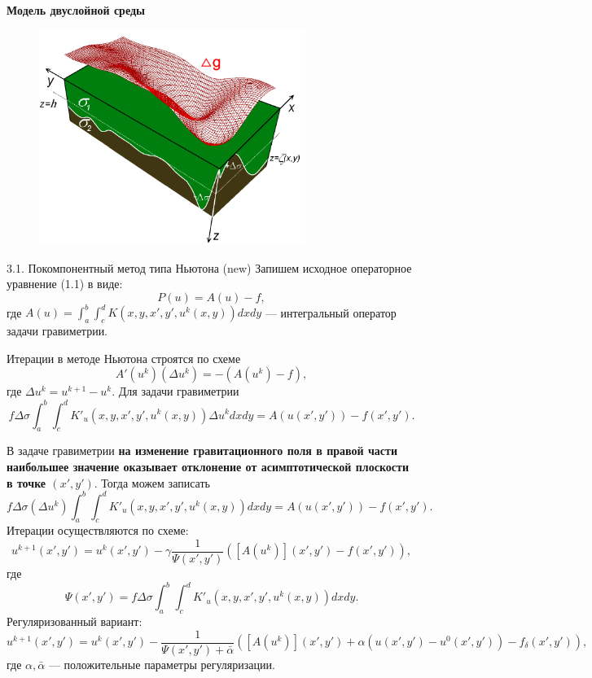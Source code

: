 \documentclass[10pt,pdf, mathserif, hyperref={unicode}]{beamer}
\begin{document}
\begin{frame}{\small\textbf{Модель двуслойной среды}}
	\begin{figure}[h]
		\centering
		\includegraphics[height=7.0cm]{grav_illust.png}
		\label{fig:twolayer}
	\end{figure}
	\centering
\end{frame}
\begin{frame}{3.1. Покомпонентный метод типа Ньютона (new)}
	Запишем исходное операторное уравнение (1.1) в виде:
	$$P(u)=A(u)-f,$$
	где $A(u)=\int_{a}^{b}\int_{c}^{d}K(x,y, x',y',u^k(x,y))dxdy$ --- интегральный оператор задачи гравиметрии.
	
	Итерации в методе Ньютона строятся по схеме
	$$A'(u^k)(\Delta u^k)=-(A(u^k)-f),$$ где $\Delta u^k=u^{k+1}-u^k$.
	Для задачи гравиметрии
	$$f\Delta\sigma\int_{a}^{b}\int_{c}^{d}K'_u(x,y, x',y',u^k(x,y))\Delta u^k dxdy=A(u(x',y'))-f(x',y').$$
\end{frame}
\begin{frame}{}
	В задаче гравиметрии {\textbf{\color{blue}на изменение гравитационного поля в правой части наибольшее значение оказывает отклонение от асимптотической плоскости в точке $(x',y')$}}. Тогда можем записать
	$$f\Delta\sigma(\Delta u^k)\int_{a}^{b}\int_{c}^{d}K'_u(x,y, x',y',u^k(x,y)) dxdy=A(u(x',y'))-f(x',y').$$
	Итерации осуществляются по схеме:
	$$u^{k+1}(x',y')=u^k(x',y')-\gamma\frac{1}{\varPsi(x',y')}([A(u^k)](x',y')-f(x',y')),$$
	где $$\varPsi(x',y')=f\Delta\sigma\int_{a}^{b}\int_{c}^{d}K'_u(x,y, x',y',u^k(x,y)) dxdy.$$
	Регуляризованный вариант:
	$$u^{k+1}(x',y')=u^k(x',y')-\frac{1}{\varPsi(x',y')+\bar{\alpha}}([A(u^k)](x',y')+\alpha (u(x',y')-u^0(x',y'))-f_\delta(x',y')),$$
	где $\alpha, \bar{\alpha}$ --- положительные параметры регуляризации.
	\let\thefootnote\relax\let\thefootnote\relax{}
\end{frame}
\end{document}
